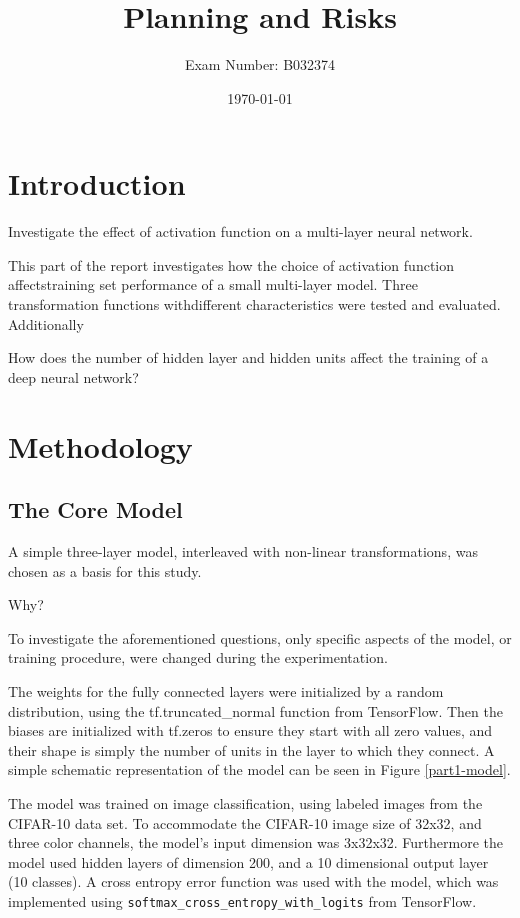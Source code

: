 \documentclass[]{article}
\title{Planning and Risks}
\author{Exam Number: B032374}
\date{\today}
\begin{document}
\maketitle

\section{Introduction}

Investigate the effect of activation function on a multi-layer neural network.

This part of the report investigates how the choice of activation function affectstraining set performance of a small multi-layer model. Three transformation functions withdifferent characteristics were tested and evaluated.
Additionally

How does the number of hidden layer and hidden units affect the training of a deep neural network?



\section{Methodology}

\subsection{The Core Model}

A simple three-layer model, interleaved with non-linear transformations, was chosen as a basis for this study. 

Why?

To investigate the aforementioned questions, only specific aspects of the model, or training procedure, were changed during the experimentation. 

The weights for the fully connected layers were initialized by a random distribution, using the tf.truncated\_normal function from TensorFlow. Then the biases are initialized with tf.zeros to ensure they start with all zero values, and their shape is simply the number of units in the layer to which they connect. A simple schematic representation of the model can be seen in Figure \ref{part1-model}.

The model was trained on image classification, using labeled images from the CIFAR-10 data set. To accommodate the CIFAR-10 image size of 32x32, and three color channels, the model's input dimension was 3x32x32. Furthermore the model used hidden layers of dimension 200, and a 10 dimensional output layer (10 classes). A cross entropy error function was used with the model, which was implemented using  \texttt{softmax\_cross\_entropy\_with\_logits} from TensorFlow.
\end{document}
